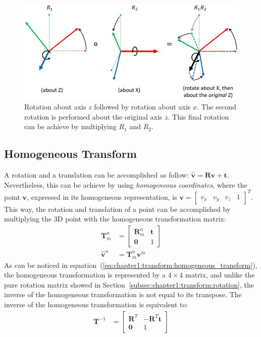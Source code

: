 \begin{figure}
    \centering
    \includegraphics[width=\textwidth]{Images/fig16-rotations.png}
    \caption[Rotation around axis $z$ followed by rotation about axis $x$]{Rotation about axis $z$ followed by rotation about axis $x$. The second rotation is performed about the original axis $z$. This final rotation can be achieve by multiplying $R_1$ and $R_2$.\cite{hauser-robotics-systems}}
    \label{fig:chapter1:transform:rotation_z_x}
\end{figure}

\subsection{Homogeneous Transform}
\label{subsec:chapter1:transform:rototranslation}
A rotation and a translation can be accomplished as follow: $\hat{\bm{v}} = \bm{R}\bm{v} + \bm{t}$. Nevertheless, this can be achieve by using \emph{homogeneous coordinates}, where the point $\bm{v}$, expressed in its homogeneous representation, is $\bm{v} = \begin{bmatrix}v_x & v_y & v_z & 1\end{bmatrix}^T$. This way, the rotation and translation of a point can be accomplished by multiplying the 3D point with the homogeneous transformation matrix:
\begin{align}
    \bm{T}_m^n &= \begin{bmatrix}
        \bm{R}_m^n & \bm{t} \\
        \bm{0} & 1
    \end{bmatrix}
    \label{eq:chapter1:transform:homogeneous_transform}\\
    \hat{\bm{v}}^n &= \bm{T}_m^n\bm{v}^m
\end{align}
As can be noticed in equation~(\ref{eq:chapter1:transform:homogeneous_transform}), the homogeneous transformation is represented by a $4 \times 4$ matrix, and unlike the pure rotation matrix showed in Section~\ref{subsec:chapter1:transform:rotation}, the inverse of the homogeneous transformation is not equal to its transpose. The inverse of the homogeneous transformation is equivalent to:
\begin{align}
    \bm{T}^{-1} &= \begin{bmatrix}
        \bm{R}^T & -\bm{R}^T\bm{t} \\
        \bm{0} & 1
    \end{bmatrix}
\end{align}


